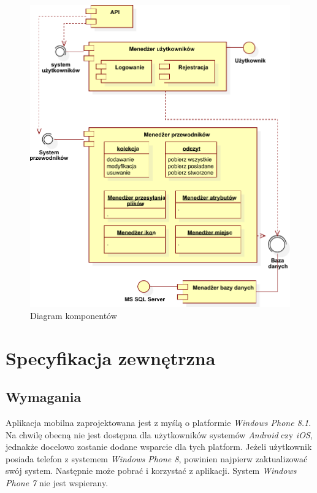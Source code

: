 \documentclass[a4paper]{book}
\begin{document}
		
		\begin{figure}		
			\centering
			\includegraphics[width=1.0\textwidth]{images/component.pdf}
			\caption{Diagram komponentów}
			\label{fig:component}
		\end{figure}
		
		
	\chapter{Specyfikacja zewnętrzna}
	\label{id:cha:specyfikacja_zewnetrzna}
		\section{Wymagania}
		\label{id:sec:wymagania}
		Aplikacja mobilna zaprojektowana jest z myślą o platformie \emph{Windows Phone 8.1}. Na chwilę obecną nie jest dostępna dla użytkowników systemów \emph{Android} czy \emph{iOS}, jednakże docelowo zostanie dodane wsparcie dla tych platform. Jeżeli użytkownik posiada telefon z systemem \emph{Windows Phone 8}, powinien najpierw zaktualizować swój system. Następnie może pobrać i korzystać z aplikacji. System \emph{Windows Phone 7} nie jest wspierany.
		
\end{document}
